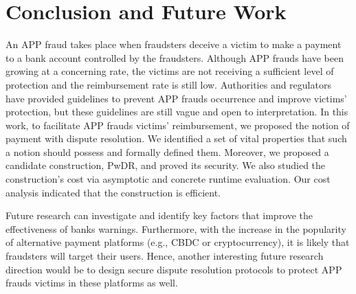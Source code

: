 

\section{Conclusion and Future Work}\label{sec::conclusion}


An APP fraud takes place when fraudsters deceive a victim to make a payment to a bank account controlled by the fraudsters. Although APP frauds have been growing at a concerning rate, the  victims are not receiving a sufficient level of protection and the reimbursement rate is still low. Authorities and regulators have  provided guidelines  to prevent APP frauds occurrence and improve victims’ protection, but these guidelines are still vague and open to interpretation. In this work, to facilitate APP frauds victims’ reimbursement,  we proposed the notion of payment with dispute resolution. We identified a set of vital properties that such a notion  should possess and formally defined them. Moreover,  we proposed a candidate construction, PwDR, and proved its security.  We also  studied the construction's cost via asymptotic and concrete runtime evaluation. Our cost analysis indicated that the construction is efficient. 



Future research can investigate and identify key factors that  improve the effectiveness of banks warnings.  Furthermore, with the increase in the popularity of  alternative payment platforms (e.g., CBDC or cryptocurrency), it is likely that  fraudsters will target their users. Hence, another interesting future research direction would be to design secure dispute resolution protocols  to protect  APP frauds victims in these platforms as well. 





